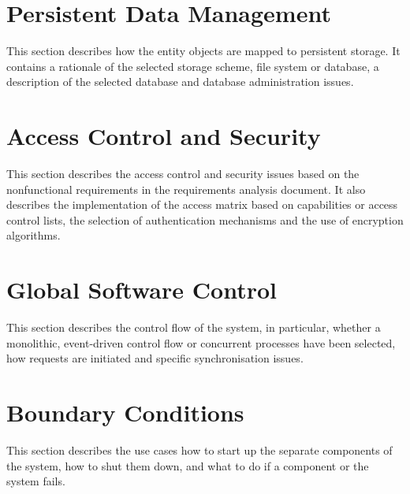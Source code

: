 \documentclass[a4paper,12pt]{scrartcl}
\begin{document}
    \section{Persistent Data Management}
    This section describes how the entity objects are mapped to persistent storage.
    It contains a rationale of the selected storage scheme, file system or database, a description of the selected database and database administration issues.


    \section{Access Control and Security}
    This section describes the access control and security issues based on the nonfunctional requirements in the requirements analysis document. It also describes the implementation of the access matrix based on capabilities or access control lists, the selection of authentication mechanisms and the use of encryption algorithms.


    \section{Global Software Control}
    This section describes the control flow of the system, in particular, whether a monolithic, event-driven control flow or concurrent processes have been selected, how requests are initiated and specific synchronisation issues.


    \section{Boundary Conditions}
    This section describes the use cases how to start up the separate components of the system, how to shut them down, and what to do if a component or the system fails.
\end{document}
